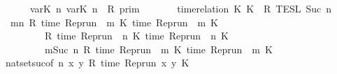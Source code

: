 \begin{isabellebody}
\ \ \ \ \ {\isasymlbrakk}\ {\isasymlfloor}{\isasymtau}\isactrlsub v\isactrlsub a\isactrlsub r{\isacharparenleft}K\ n{\isacharparenright}{\isacharcomma}\ {\isasymtau}\isactrlsub v\isactrlsub a\isactrlsub r{\isacharparenleft}K\ n{\isacharparenright}{\isasymrfloor}\ {\isasymin}\ R\ {\isasymrbrakk}\isactrlsub p\isactrlsub r\isactrlsub i\isactrlsub m\isanewline
\ \ \ \ \ {\isasyminter}\ {\isasymlbrakk}\ time{\isacharminus}relation\ {\isasymlfloor}K\ K\ {\isasymin}\ R\ {\isasymrbrakk}\isactrlsub T\isactrlsub E\isactrlsub S\isactrlsub L\isactrlbsup {\isasymge}\ Suc\ n\isactrlesup {\isacartoucheclose}\isanewline
%
\isadelimproof
%
\endisadelimproof
%
\isatagproof
{}\isamarkupfalse%
\ {\isacharminus}\isanewline
\ \ \isamarkupfalse%
\ {\isacartoucheopen}{\isacharbraceleft}{\isasymrho}{\isachardot}\ {\isasymforall}m{\isasymge}n{\isachardot}\ R\ {\isacharparenleft}time\ {\isacharparenleft}{\isacharparenleft}Rep{\isacharunderscore}run\ {\isasymrho}{\isacharparenright}\ m\ K\ time\ {\isacharparenleft}{\isacharparenleft}Rep{\isacharunderscore}run\ {\isasymrho}{\isacharparenright}\ m\ K\isanewline
\ \ \ \ \ \ \ {\isacharequal}\ {\isacharbraceleft}{\isasymrho}{\isachardot}\ R\ {\isacharparenleft}time\ {\isacharparenleft}{\isacharparenleft}Rep{\isacharunderscore}run\ {\isasymrho}{\isacharparenright}\ n\ K\ time\ {\isacharparenleft}{\isacharparenleft}Rep{\isacharunderscore}run\ {\isasymrho}{\isacharparenright}\ n\ K\isanewline
\ \ \ \ \ \ \ {\isasyminter}\ {\isacharbraceleft}{\isasymrho}{\isachardot}\ {\isasymforall}m{\isasymge}Suc\ n{\isachardot}\ R\ {\isacharparenleft}time\ {\isacharparenleft}{\isacharparenleft}Rep{\isacharunderscore}run\ {\isasymrho}{\isacharparenright}\ m\ K\ time\ {\isacharparenleft}{\isacharparenleft}Rep{\isacharunderscore}run\ {\isasymrho}{\isacharparenright}\ m\ K\isanewline
\ \ \ \ \isamarkupfalse%
\ nat{\isacharunderscore}set{\isacharunderscore}suc{\isacharbrackleft}of\ {\isacartoucheopen}n{\isacartoucheclose}\ {\isacartoucheopen}{\isasymlambda}x\ y{\isachardot}\ R\ {\isacharparenleft}time\ {\isacharparenleft}{\isacharparenleft}Rep{\isacharunderscore}run\ x{\isacharparenright}\ y\ K\isanewline

\end{isabellebody}
